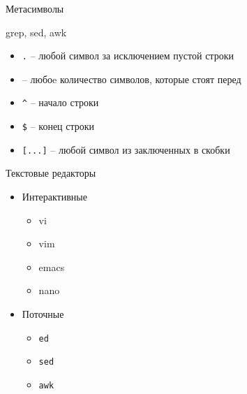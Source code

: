 \begin{frame}[fragile]{Метасимволы}
	\begin{block}{grep, sed, awk}
	\end{block}
	\begin{itemize}
		\item {\tt .} -- любой символ за исключением пустой строки
		\item {\tt *} -- любоe количество символов, которые стоят перед {\tt *}
		\item {\tt \^{}} -- начало строки
		\item {\tt \$} -- конец строки
		\item {\tt [...]} -- любой символ из заключенных в скобки
	\end{itemize}
\end{frame}

\begin{frame}{Текстовые редакторы}
	\begin{itemize}
		\item Интерактивные
			\begin{itemize}
				\item vi
				\item vim
				\item emacs
				\item nano
			\end{itemize}
		\item Поточные
			\begin{itemize}
				\item {\tt ed}
				\item {\tt sed}
				\item {\tt awk}
			\end{itemize}
	\end{itemize}
\end{frame}


